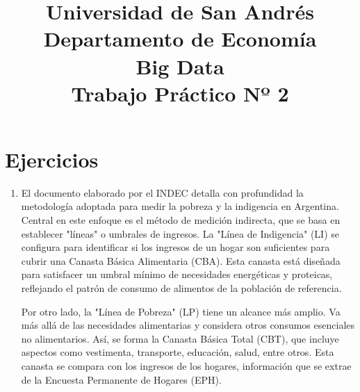 \documentclass[a4paper,12pt]{article}
\author{}
\date{}
\title{\Large \textbf{Universidad de San Andrés}\\ Departamento de Economía \\ Big Data \\ \vspace{5mm} \LARGE \textbf{Trabajo Práctico Nº 2}  \vspace{0cm} \normalsize 
  \vspace{0cm} \Large \textit{}}
\begin{document}
\maketitle

\section*{Ejercicios}
\begin{enumerate}
\item El documento elaborado por el INDEC detalla con profundidad la metodología adoptada para medir la pobreza y la indigencia en Argentina. Central en este enfoque es el método de medición indirecta, que se basa en establecer "líneas" o umbrales de ingresos. La "Línea de Indigencia" (LI) se configura para identificar si los ingresos de un hogar son suficientes para cubrir una Canasta Básica Alimentaria (CBA). Esta canasta está diseñada para satisfacer un umbral mínimo de necesidades energéticas y proteicas, reflejando el patrón de consumo de alimentos de la población de referencia.

Por otro lado, la "Línea de Pobreza" (LP) tiene un alcance más amplio. Va más allá de las necesidades alimentarias y considera otros consumos esenciales no alimentarios. Así, se forma la Canasta Básica Total (CBT), que incluye aspectos como vestimenta, transporte, educación, salud, entre otros. Esta canasta se compara con los ingresos de los hogares, información que se extrae de la Encuesta Permanente de Hogares (EPH).


\end{enumerate}
\end{document}
